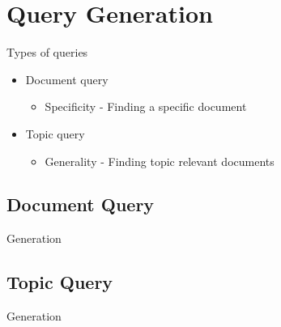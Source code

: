\section{Query Generation}
\begin{frame}{\insertsection}{Types of queries}
    \begin{itemize}
        \item Document query
        \begin{itemize}
            \item Specificity - Finding a specific document
        \end{itemize}
        \item Topic query
        \begin{itemize}
            \item Generality - Finding topic relevant documents
        \end{itemize}
    \end{itemize}
\end{frame}

\subsection{Document Query}
\begin{frame}{\insertsubsection}{Generation}
    
\end{frame}

\subsection{Topic Query}
\begin{frame}{\insertsubsection}{Generation}
    
\end{frame}